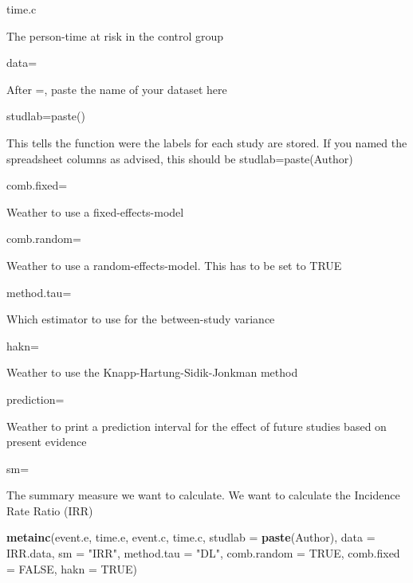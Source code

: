\documentclass[]{book}
\newenvironment{Shaded}{\begin{snugshade}}{\end{snugshade}}
\newcommand{\DataTypeTok}[1]{\textcolor[rgb]{0.13,0.29,0.53}{#1}}
\newcommand{\KeywordTok}[1]{\textcolor[rgb]{0.13,0.29,0.53}{\textbf{#1}}}
\newcommand{\NormalTok}[1]{#1}
\newcommand{\OtherTok}[1]{\textcolor[rgb]{0.56,0.35,0.01}{#1}}
\newcommand{\StringTok}[1]{\textcolor[rgb]{0.31,0.60,0.02}{#1}}
\begin{document}
time.c

The person-time at risk in the control group

data=

After =, paste the name of your dataset here

studlab=paste()

This tells the function were the labels for each study are stored. If you named the spreadsheet columns as advised, this should be studlab=paste(Author)

comb.fixed=

Weather to use a fixed-effects-model

comb.random=

Weather to use a random-effects-model. This has to be set to TRUE

method.tau=

Which estimator to use for the between-study variance

hakn=

Weather to use the Knapp-Hartung-Sidik-Jonkman method

prediction=

Weather to print a prediction interval for the effect of future studies based on present evidence

sm=

The summary measure we want to calculate. We want to calculate the Incidence Rate Ratio (IRR)

\begin{Shaded}
\begin{Highlighting}[]
\KeywordTok{metainc}\NormalTok{(event.e, }
\NormalTok{        time.e, }
\NormalTok{        event.c, }
\NormalTok{        time.c, }
        \DataTypeTok{studlab =} \KeywordTok{paste}\NormalTok{(Author), }
        \DataTypeTok{data =}\NormalTok{ IRR.data, }
        \DataTypeTok{sm =} \StringTok{"IRR"}\NormalTok{,}
        \DataTypeTok{method.tau =} \StringTok{"DL"}\NormalTok{,}
        \DataTypeTok{comb.random =} \OtherTok{TRUE}\NormalTok{,}
        \DataTypeTok{comb.fixed =} \OtherTok{FALSE}\NormalTok{,}
        \DataTypeTok{hakn =} \OtherTok{TRUE}\NormalTok{)}
\end{Highlighting}
\end{Shaded}
\end{document}
